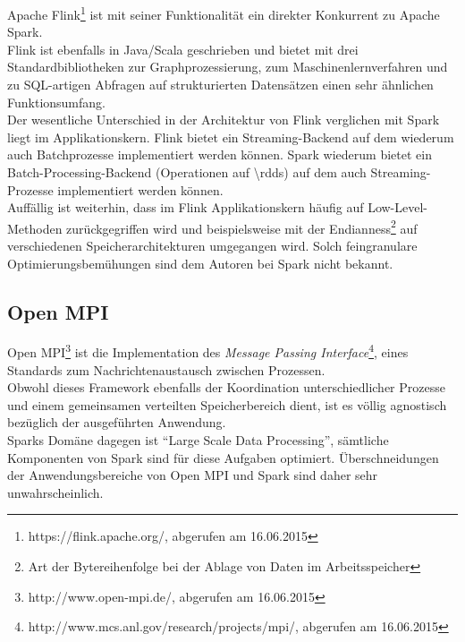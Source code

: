 Apache Flink\footnote{https://flink.apache.org/, abgerufen am 16.06.2015} ist mit seiner Funktionalität ein direkter Konkurrent zu Apache Spark.\\

Flink ist ebenfalls in Java/Scala geschrieben und bietet mit drei Standardbibliotheken zur Graphprozessierung, zum Maschinenlernverfahren und zu SQL-artigen Abfragen auf strukturierten Datensätzen einen sehr ähnlichen Funktionsumfang.\\

Der wesentliche Unterschied in der Architektur von Flink verglichen mit Spark liegt im Applikationskern. Flink bietet ein Streaming-Backend auf dem wiederum auch Batchprozesse implementiert werden können. Spark wiederum bietet ein Batch-Processing-Backend (Operationen auf \glspl{\rdd}) auf dem auch Streaming-Prozesse implementiert werden können.\\

Auffällig ist weiterhin, dass im Flink Applikationskern häufig auf Low-Level-Methoden zurückgegriffen wird und beispielsweise mit der Endianness\footnote{Art der Bytereihenfolge bei der Ablage von Daten im Arbeitsspeicher} auf verschiedenen Speicherarchitekturen umgegangen wird. Solch feingranulare Optimierungsbemühungen sind dem Autoren bei Spark nicht bekannt.\\

\subsection{Open MPI}

Open MPI\footnote{http://www.open-mpi.de/, abgerufen am 16.06.2015} ist die Implementation des \textit{Message Passing Interface}\footnote{http://www.mcs.anl.gov/research/projects/mpi/, abgerufen am 16.06.2015}, eines Standards zum Nachrichtenaustausch zwischen Prozessen.\\

Obwohl dieses Framework ebenfalls der Koordination unterschiedlicher Prozesse und einem gemeinsamen verteilten Speicherbereich dient, ist es völlig agnostisch bezüglich der ausgeführten Anwendung.\\
Sparks Domäne dagegen ist "`Large Scale Data Processing"', sämtliche Komponenten von Spark sind für diese Aufgaben optimiert. Überschneidungen der Anwendungsbereiche von Open MPI und Spark sind daher sehr unwahrscheinlich.\\